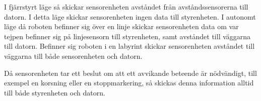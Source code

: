 I fjärrstyrt läge så skickar sensorenheten avståndet från avståndssensorerna till datorn. 
I detta läge skickar sensorenheten ingen data till styrenheten. I autonomt läge då 
roboten befinner sig över en linje skickar sensorenheten data om var tejpen befinner 
sig på linjesensorn till styrenheten, samt avståndet till väggarna till datorn. Befinner sig 
roboten i en labyrint skickar sensorenheten avståndet till väggarna till både sensorenheten 
och datorn.

Då sensorenheten tar ett beslut om att ett avvikande beteende är nödvändigt, till exempel 
en korsning eller en stoppmarkering, så skickas denna information alltid till både styrenheten och datorn.


